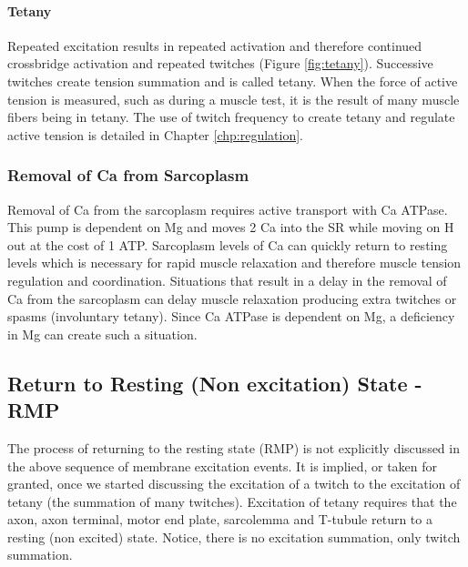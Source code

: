 

\paragraph{Tetany}
Repeated excitation results in repeated activation and therefore continued crossbridge activation and repeated twitches (Figure \ref{fig:tetany}). Successive twitches create tension summation and is called tetany. When the force of active tension is measured, such as during a muscle test, it is the result of many muscle fibers being in tetany. The use of twitch frequency to create tetany and regulate active tension is detailed in Chapter \ref{chp:regulation}. 


\subsubsection{Removal of Ca from Sarcoplasm}
Removal of Ca from the sarcoplasm requires active transport with Ca ATPase. This pump is dependent on Mg and moves 2 Ca into the SR while moving on H out at the cost of 1 ATP. Sarcoplasm levels of Ca can quickly return to resting levels which is necessary for rapid muscle relaxation and therefore muscle tension regulation and coordination. Situations that result in a delay in the removal of Ca from the sarcoplasm can delay muscle relaxation producing extra twitches or spasms (involuntary tetany). Since Ca ATPase is dependent on Mg, a deficiency in Mg can create such a situation.

\subsection{Return to Resting (Non excitation) State - RMP}
The process of returning to the resting state (RMP) is not explicitly discussed in the above sequence of membrane excitation events. It is implied, or taken for granted, once we started discussing the excitation of a twitch to the excitation of tetany (the summation of many twitches). Excitation of tetany requires that the axon, axon terminal, motor end plate, sarcolemma and T-tubule return to a resting (non excited) state. Notice, there is no excitation summation, only twitch summation.
